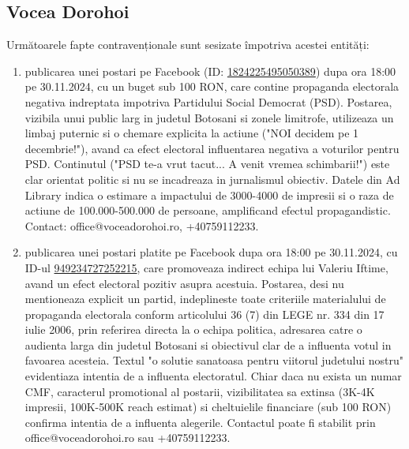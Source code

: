 \documentclass[a4paper,12pt]{article}
\begin{document}
\vspace{0.5cm}

\subsection{Vocea Dorohoi}
Următoarele fapte contravenționale sunt sesizate împotriva acestei entități:

\begin{enumerate}[leftmargin=*, label=\arabic*.)]
    \item publicarea unei postari pe Facebook (ID: \href{https://www.facebook.com/ads/library/?id=1824225495050389}{1824225495050389}) dupa ora 18:00 pe 30.11.2024, cu un buget sub 100 RON, care contine propaganda electorala negativa indreptata impotriva Partidului Social Democrat (PSD). Postarea, vizibila unui public larg in judetul Botosani si zonele limitrofe, utilizeaza un limbaj puternic si o chemare explicita la actiune ("NOI decidem pe 1 decembrie!"), avand ca efect electoral influentarea negativa a voturilor pentru PSD.  Continutul ("PSD te-a vrut tacut... A venit vremea schimbarii!") este clar orientat politic si nu se incadreaza in jurnalismul obiectiv.  Datele din Ad Library indica o estimare a impactului de 3000-4000 de impresii si o raza de actiune de 100.000-500.000 de persoane, amplificand efectul propagandistic. Contact: office@voceadorohoi.ro, +40759112233.
    \item publicarea unei postari platite pe Facebook dupa ora 18:00 pe 30.11.2024, cu ID-ul \href{https://www.facebook.com/ads/library/?id=949234727252215}{949234727252215}, care promoveaza indirect echipa lui Valeriu Iftime, avand un efect electoral pozitiv asupra acestuia. Postarea, desi nu mentioneaza explicit un partid, indeplineste toate criteriile materialului de propaganda electorala conform articolului 36 (7) din LEGE nr. 334 din 17 iulie 2006, prin referirea directa la o echipa politica, adresarea catre o audienta larga din judetul Botosani si obiectivul clar de a influenta votul in favoarea acesteia.  Textul "o solutie sanatoasa pentru viitorul judetului nostru" evidentiaza intentia de a influenta electoratul.  Chiar daca nu exista un numar CMF, caracterul promotional al postarii, vizibilitatea sa extinsa (3K-4K impresii, 100K-500K reach estimat) si cheltuielile financiare (sub 100 RON) confirma intentia de a influenta alegerile.  Contactul poate fi stabilit prin office@voceadorohoi.ro sau +40759112233.
\end{enumerate}

\vspace{0.5cm}
\end{document}
